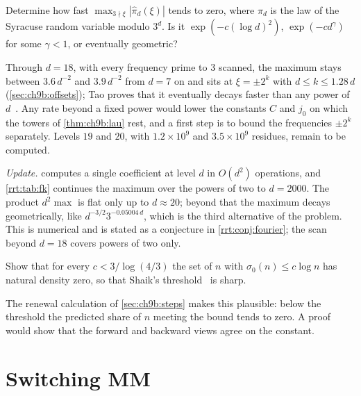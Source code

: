 \begin{problem*}\label{prob:ch11:b2}
Determine how fast $\max_{3\nmid\xi}|\widehat\pi_d(\xi)|$ tends to zero, where $\pi_d$ is the law of the Syracuse random variable modulo $3^d$. Is it $\exp(-c(\log d)^2)$, $\exp(-cd^{\gamma})$ for some $\gamma<1$, or eventually geometric?
\end{problem*}

Through $d=18$, with every frequency prime to $3$ scanned, the maximum stays between $3.6\,d^{-2}$ and $3.9\,d^{-2}$ from $d=7$ on and sits at $\xi=\pm2^k$ with $d\le k\le1.28\,d$ (\cref{sec:ch9b:offsets}); Tao proves that it eventually decays faster than any power of $d$~\cite[Proposition~1.17]{tao2022}. Any rate beyond a fixed power would lower the constants $C$ and $j_0$ on which the towers of \cref{thm:ch9b:lau} rest, and a first step is to bound the frequencies $\pm2^k$ separately. Levels $19$ and $20$, with $1.2\times10^9$ and $3.5\times10^9$ residues, remain to be computed.

\emph{Update.}  computes a single coefficient at level $d$ in $O(d^2)$ operations, and \cref{rrt:tab:fk} continues the maximum over the powers of two to $d=2000$. The product $d^2\max$ is flat only up to $d\approx20$; beyond that the maximum decays geometrically, like $d^{-3/2}3^{-0.05004\,d}$, which is the third alternative of the problem. This is numerical and is stated as a conjecture in \cref{rrt:conj:fourier}; the scan beyond $d=18$ covers powers of two only.

\begin{problem*}\label{prob:ch11:b3}
Show that for every $c<3/\log(4/3)$ the set of $n$ with $\sigma_0(n)\le c\log n$ has natural density zero, so that Shaik's threshold~\cite{shaik2026} is sharp.
\end{problem*}

The renewal calculation of \cref{sec:ch9b:steps} makes this plausible: below the threshold the predicted share of $n$ meeting the bound tends to zero. A proof would show that the forward and backward views agree on the constant.

\section{Switching MM}\label{sec:ch11:smm}

